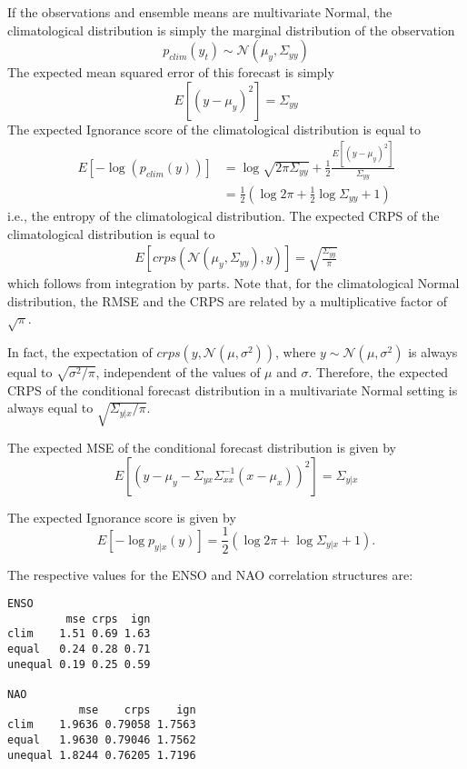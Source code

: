 \documentclass[12pt]{article}
\begin{document}
If the observations and ensemble means are multivariate Normal, the climatological distribution is simply the marginal distribution of the observation
%
\begin{equation}
p_{clim}(y_t) \sim \mathcal{N}(\mu_y, \Sigma_{yy})
\end{equation}
%
The expected mean squared error of this forecast is simply
%
\begin{equation}
E[(y - \mu_y)^2] = \Sigma_{yy}
\end{equation}
%
The expected Ignorance score of the climatological distribution is equal to
%
\begin{align}
E[-\log(p_{clim}(y))] & = \log \sqrt{2\pi \Sigma_{yy}} + \frac12 \frac{E[(y-\mu_y)^2]}{\Sigma_{yy}}\\
& = \frac12 \left(\log 2\pi + \frac12 \log\Sigma_{yy} + 1\right)
\end{align}
%
i.e., the entropy of the climatological distribution.
The expected CRPS of the climatological distribution is equal to 
\begin{align}
E[crps(\mathcal{N}(\mu_y, \Sigma_{yy}), y)] = \sqrt{\frac{\Sigma_{yy}}{\pi}}
\end{align}
%
which follows from integration by parts.
Note that, for the climatological Normal distribution, the RMSE and the CRPS are related by a multiplicative factor of $\sqrt{\pi}$.

In fact, the expectation of $crps(y,\mathcal{N(\mu,\sigma^2)})$, where $y\sim\mathcal{N}(\mu,\sigma^2)$ is always equal to $\sqrt{\sigma^2/\pi}$, independent of the values of $\mu$ and $\sigma$.
Therefore, the expected CRPS of the conditional forecast distribution in a multivariate Normal setting is always equal to $\sqrt{\Sigma_{y|x}/\pi}$.

The expected MSE of the conditional forecast distribution is given by 
\begin{equation}
E[(y - \mu_y - \Sigma_{yx}\Sigma_{xx}^{-1}(x - \mu_x))^2] = \Sigma_{y|x}
\end{equation}

The expected Ignorance score is given by
\begin{equation}
E[-\log p_{y|x}(y)] = \frac12 (\log 2\pi + \log\Sigma_{y|x} + 1).
\end{equation}

The respective values for the ENSO and NAO correlation structures are:

\begin{verbatim}
ENSO
         mse crps  ign
clim    1.51 0.69 1.63
equal   0.24 0.28 0.71
unequal 0.19 0.25 0.59

NAO
           mse    crps    ign
clim    1.9636 0.79058 1.7563
equal   1.9630 0.79046 1.7562
unequal 1.8244 0.76205 1.7196
\end{verbatim}
\end{document}
